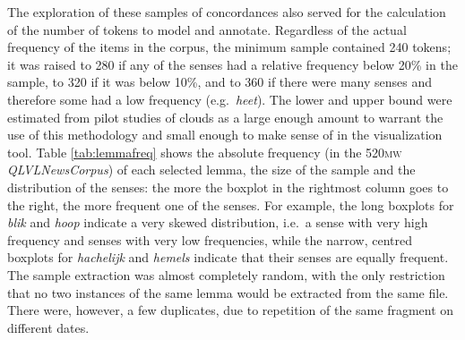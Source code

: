 \documentclass[
]{book}
\begin{document}
The exploration of these samples of concordances also served for the calculation of the number of tokens to model and annotate. Regardless of the actual frequency of the items in the corpus, the minimum sample contained 240 tokens; it was raised to 280 if any of the senses had a relative frequency below 20\% in the sample, to 320 if it was below 10\%, and to 360 if there were many senses and therefore some had a low frequency (e.g.~\emph{heet}). The lower and upper bound were estimated from pilot studies of clouds as a large enough amount to warrant the use of this methodology and small enough to make sense of in the visualization tool. Table \ref{tab:lemmafreq} shows the absolute frequency (in the \textsc{520mw} \emph{QLVLNewsCorpus}) of each selected lemma, the size of the sample and the distribution of the senses: the more the boxplot in the rightmost column goes to the right, the more frequent one of the senses. For example, the long boxplots for \emph{blik} and \emph{hoop} indicate a very skewed distribution, i.e.~a sense with very high frequency and senses with very low frequencies, while the narrow, centred boxplots for \emph{hachelijk} and \emph{hemels} indicate that their senses are equally frequent.
The sample extraction was almost completely random, with the only restriction that no two instances of the same lemma would be extracted from the same file. There were, however, a few duplicates, due to repetition of the same fragment on different dates.
\end{document}
